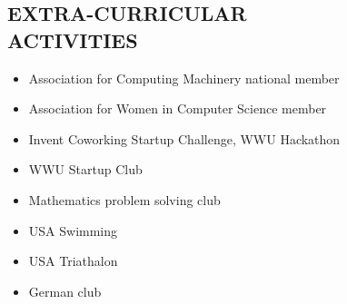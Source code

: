 \documentclass[line,margin]{res}
\begin{document}
\begin{resume}
\section{EXTRA-CURRICULAR \\ ACTIVITIES} 
	\begin{itemize} \itemsep -1pt
	\item Association for Computing Machinery national member
	\item Association for Women in Computer Science member
	\item Invent Coworking Startup Challenge, WWU Hackathon
	\item WWU Startup Club
	\item Mathematics problem solving club
	\item USA Swimming
	\item USA Triathalon
	\item German club
	\end{itemize}
\end{resume}
\end{document}

